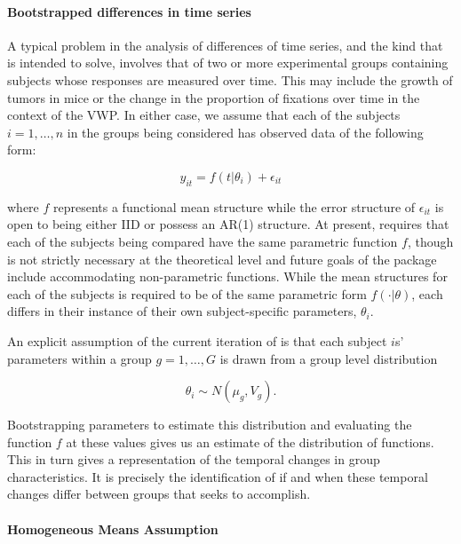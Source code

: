 \paragraph{Bootstrapped differences in time series}

A typical problem in the analysis of differences of time series, and the kind that  is intended to solve, involves that of two or more experimental groups containing subjects whose responses are measured over time. This may include the growth of tumors in  mice or the change in the proportion of fixations over time in the context of the VWP. In either case, we assume that each of the subjects $i = 1, \dots, n$ in the groups being considered has observed data of the following form:

\begin{equation}\label{eq:mean_structure}
y_{it} = f(t | \theta_i) + \epsilon_{it} 
\end{equation}


where $f$ represents a functional mean structure while the error structure of $\epsilon_{it}$ is open to being either IID or possess an AR(1) structure. At present,  requires that each of the subjects being compared have the same parametric function $f$, though is not strictly necessary at the theoretical level and future goals of the package include accommodating non-parametric functions. While the mean structures for each of the subjects is required to be of the same parametric form $f(\cdot | \theta)$, each differs in their instance of their own subject-specific parameters, $\theta_i$.

An explicit assumption of the current iteration of  is that each subject $i$s' parameters within a group $g = 1, \dots, G$ is drawn from a group level distribution

\begin{equation}\label{eq:group_dist}
\theta_i \sim N(\mu_g, V_g).
\end{equation}

Bootstrapping parameters to estimate this distribution and evaluating the function $f$ at these values gives us an estimate of the distribution of functions. This in turn gives a representation of the temporal changes in group characteristics. It is precisely the identification of if and when these temporal changes differ between groups that  seeks to accomplish.


\paragraph{Homogeneous Means Assumption}

